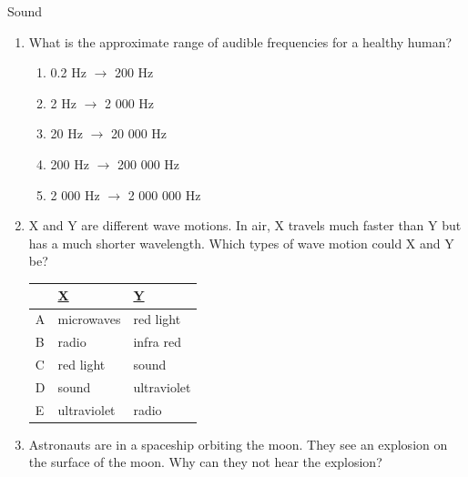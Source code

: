\begin{eocexercises}{Sound}
\begin{enumerate}[noitemsep, label=\textbf{\arabic*}. ]
\begin{enumerate}[noitemsep, label=\textbf{\alph*}. ]
\end{enumerate}
                \label{m38800*uid40}\item What is the approximate range of audible frequencies for a healthy human?
\label{m38800*id186144}\begin{enumerate}[noitemsep, label=\textbf{\alph*}. ] 
            \label{m38800*uid41}\item 0.2 Hz $\to $ 200 Hz
\label{m38800*uid42}\item 2 Hz $\to $ 2 000 Hz
\label{m38800*uid43}\item 20 Hz $\to $ 20 000 Hz
\label{m38800*uid44}\item 200 Hz $\to $ 200 000 Hz
\label{m38800*uid45}\item 2 000 Hz $\to $ 2 000 000 Hz
\end{enumerate}
                \label{m38800*uid46}\item X and Y are different wave motions. In air, X travels much faster than Y but has a much shorter wavelength. Which types of wave motion could X and Y be?
          \begin{table}[H]
        \begin{center}
      \label{m38800*id186268}
    \noindent
      \begin{tabular}{|l|l|l|}\hline
         &
        \uline{X} &
        \uline{Y} \\ \hline
        A &
        microwaves &
        red light \\ \hline
        B &
        radio &
        infra red \\ \hline
        C &
        red light &
        sound \\ \hline
        D &
        sound &
        ultraviolet \\ \hline
        E &
        ultraviolet &
        radio \\ \hline
    \end{tabular}
      \end{center}
\end{table}
    \par
          \label{m38800*uid47}\item Astronauts are in a spaceship orbiting the moon. They see an explosion on the surface of the moon. Why can they not hear the explosion?
\label{m38800*id186399}\begin{enumerate}[noitemsep, label=\textbf{\alph*}. ] 

\end{enumerate}
\end{enumerate}
\end{eocexercises}
